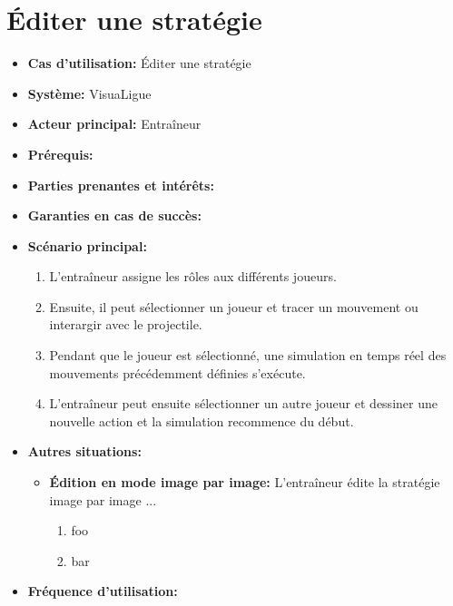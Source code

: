\section{\'Editer une stratégie}
\label{sec:ajouter_une_strategie}
\begin{itemize}
    \item \textbf{Cas d'utilisation:} \'Editer une strat\'egie
    \item \textbf{Syst\`eme:} VisuaLigue
    \item \textbf{Acteur principal:} Entra\^ineur
    \item \textbf{Pr\'erequis:}
    \item \textbf{Parties prenantes et int\'er\^ets:}
    \item \textbf{Garanties en cas de succ\`es:}
    \item \textbf{Sc\'enario principal:}
        \begin{enumerate}
            \item L'entraîneur assigne les r\^oles aux diff\'erents joueurs.
            \item Ensuite, il peut s\'electionner un joueur et tracer un mouvement ou interargir avec le projectile.
            \item Pendant que le joueur est s\'electionn\'e, une simulation en temps r\'eel des mouvements pr\'ec\'edemment d\'efinies s'ex\'ecute.
            \item L'entraîneur peut ensuite s\'electionner un autre joueur et dessiner une nouvelle action et la simulation recommence du d\'ebut.
        \end{enumerate}
    \item \textbf{Autres situations:}
        \begin{itemize}
            \item \textbf{Édition en mode image par image:} L'entraîneur édite la strat\'egie image par image ...
                \begin{enumerate}
                    \item foo
                    \item bar
                \end{enumerate}
        \end{itemize}
    \item \textbf{Fr\'equence d'utilisation:}
\end{itemize}



